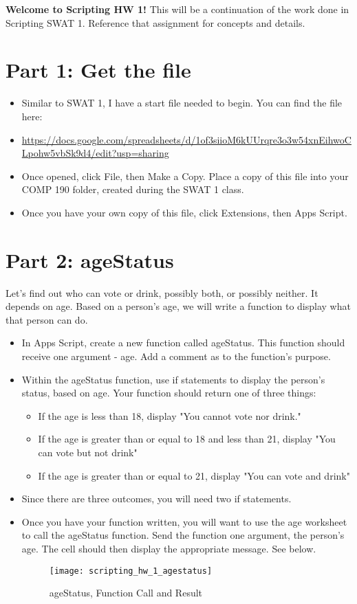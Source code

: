 \documentclass{article}
\newcommand{\AName}{Scripting HW 1}
\begin{document}
\textbf{Welcome to \AName!}  This will be a continuation of the work done in Scripting SWAT 1.  Reference that assignment for concepts and details.


\section*{Part 1: Get the file}
\begin{itemize}
    \item Similar to SWAT 1, I have a start file needed to begin.  You can find the file here:
    \item \url{https://docs.google.com/spreadsheets/d/1of3siioM6kUUrqre3o3w54xnEihwoCLpohw5vbSk9d4/edit?usp=sharing}
    \item Once opened, click File, then Make a Copy.  Place a copy of this file into your COMP 190 folder, created during the SWAT 1 class.
    \item Once you have your own copy of this file, click Extensions, then Apps Script.
\end{itemize}

\section*{Part 2: ageStatus}
Let's find out who can vote or drink, possibly both, or possibly neither.  It depends on age.  Based on a person's age, we will write a function to display what that person can do.
\begin{itemize}
	\item In Apps Script, create a new function called ageStatus.  This function should receive one argument - age.  Add a comment as to the function's purpose.
	\item Within the ageStatus function, use if statements to display the person's status, based on age.  Your function should return one of three things:
	\begin{itemize}
		\item If the age is less than 18, display "You cannot vote nor drink."
		\item If the age is greater than or equal to 18 and less than 21, display "You can vote but not drink"
		\item If the age is greater than or equal to 21, display "You can vote and drink"
	\end{itemize}
	\item Since there are three outcomes, you will need two if statements.
	\item Once you have your function written, you will want to use the age worksheet to call the ageStatus function.  Send the function one argument, the person's age.  The cell should then display the appropriate message.  See below.
	\begin{figure}[H]
  \centering
  \texttt{[image: scripting\_hw\_1\_agestatus]}
  \caption{ageStatus, Function Call and Result}
\end{figure}
\end{itemize}
\end{document}

